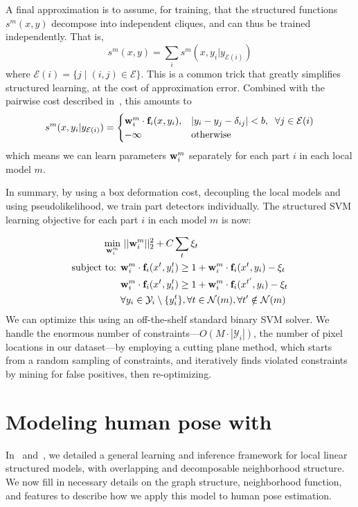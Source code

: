  A final approximation is to assume, for training, that the structured functions $s^m(x,y)$ decompose into independent cliques, and can thus be trained independently.  That is,
$$ s^m(x,y) = \sum_{i} s^m(x,y_i | y_{\mathcal{E}(i)}) $$ 
where $\mathcal{E}(i) = \{j \;|\; (i,j) \in \mathcal{E}\}$.  This is a common 
trick that greatly simplifies structured learning, at the cost of approximation 
error.  Combined with the pairwise cost described in~, this 
amounts to
$$s^m(x,y_i| y_{\mathcal{E}(i)}) = 
\begin{cases}
 \mathbf{w}^m_i \cdot \mathbf{f}_i(x,y_i), & |y_i - y_j - \delta_{ij}| < b,\;\; \forall j \in 
\mathcal{E}(i) \\
 -\infty & \text{otherwise}
\end{cases}
$$
which means we can learn parameters $\mathbf{w}_i^m$ separately for each part $i$ in 
each local model $m$.

In summary, by using a box deformation cost, decoupling the local models and using pseudolikelihood, we train part detectors individually.  The structured SVM learning objective for each part $i$ in each model $m$ is now:

\begin{align}
\min_{\mathbf{w}_i^m}&~||\mathbf{w}_i^m||_2^2 + C \sum_{t} \xi_t\\
\text{subject to: }
& \mathbf{w}_i^m \cdot \mathbf{f}_i(x^t,y_i^t) \geq 1+\mathbf{w}_i^m \cdot \mathbf{f}_i(x^t,y_i)-\xi_t 
\nonumber \\
& \mathbf{w}_i^m \cdot \mathbf{f}_i(x^t,y_i^t) \geq 1+\mathbf{w}_i^m \cdot \mathbf{f}_i(x^{t'},y_i)-\xi_t 
\nonumber \\
&\forall y_i \in \mathcal{Y}_i\setminus \{y_i^t\}, \forall t \in 
\mathcal{N}(m), \forall t' \notin \mathcal{N}(m) \nonumber
\end{align}
We can optimize this using an off-the-shelf standard binary SVM solver.  We 
handle the enormous number of constraints---$O(M \cdot |\mathcal{Y}_i|)$, the 
number of pixel locations in our dataset---by employing a cutting plane method, 
which starts from a random sampling of constraints, and iteratively finds 
violated constraints by mining for false positives, then re-optimizing.

	

\section{Modeling human pose with \LLPS}
In~ and~, we detailed a general 
learning and inference framework for local linear structured models, with 
overlapping and decomposable neighborhood structure.  We now fill in necessary 
details on the graph structure, neighborhood function, and features to describe 
how we apply this model to human pose estimation.

